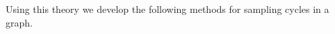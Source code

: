\documentclass[fleqn,11pt]{article}
\begin{document}

Using this theory we develop the following methods for sampling cycles in a graph.

%
\end{document}
